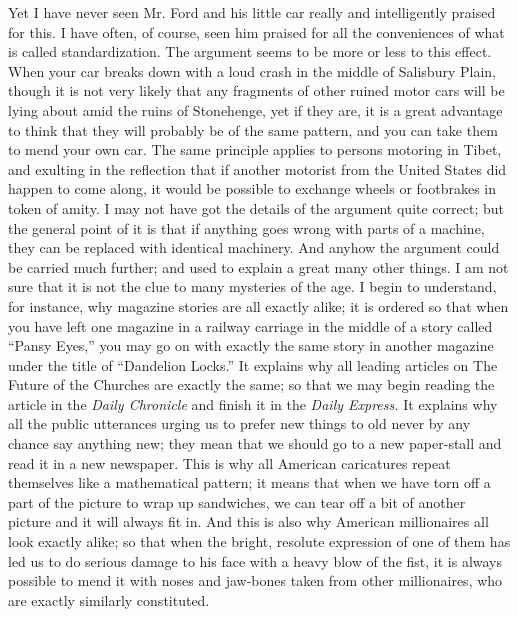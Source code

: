 \documentclass{book}
\begin{document}
Yet I have never seen Mr. Ford and his little car really and intelligently praised for this. I have often, of course, seen him praised for all the conveniences of what is called standardization. The argument seems to be more or less to this effect. When your car breaks down with a loud crash in the middle of Salisbury Plain, though it is not very likely that any fragments of other ruined motor cars will be lying about amid the ruins of Stonehenge, yet if they are, it is a great advantage to think that they will probably be of the same pattern, and you can take them to mend your own car. The same principle applies to persons motoring in Tibet, and exulting in the reflection that if another motorist from the United States did happen to come along, it would be possible to exchange wheels or footbrakes in token of amity. I may not have got the details of the argument quite correct; but the general point of it is that if anything goes wrong with parts of a machine, they can be replaced with identical machinery. And anyhow the argument could be carried much further; and used to explain a great many other things. I am not sure that it is not the clue to many mysteries of the age. I begin to understand, for instance, why magazine stories are all exactly alike; it is ordered so that when you have left one magazine in a railway carriage in the middle of a story called “Pansy Eyes,” you may go on with exactly the same story in another magazine under the title of “Dandelion Locks.” It explains why all leading articles on The Future of the Churches are exactly the same; so that we may begin reading the article in the \emph{Daily Chronicle} and finish it in the \emph{Daily Express.} It explains why all the public utterances urging us to prefer new things to old never by any chance say anything new; they mean that we should go to a new paper-stall and read it in a new newspaper. This is why all American caricatures repeat themselves like a mathematical pattern; it means that when we have torn off a part of the picture to wrap up sandwiches, we can tear off a bit of another picture and it will always fit in. And this is also why American millionaires all look exactly alike; so that when the bright, resolute expression of one of them has led us to do serious damage to his face with a heavy blow of the fist, it is always possible to mend it with noses and jaw-bones taken from other millionaires, who are exactly similarly constituted.
\end{document}
